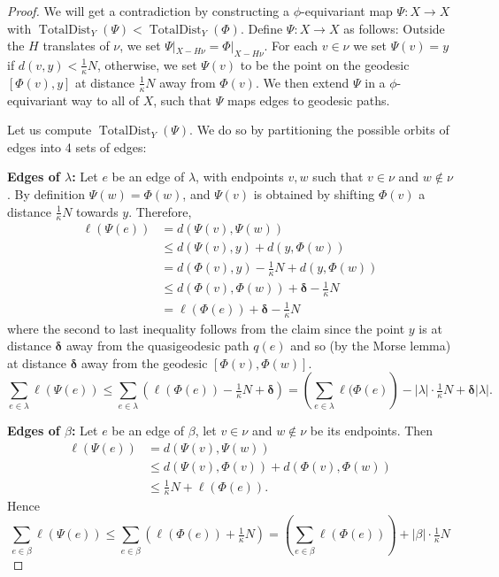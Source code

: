 \documentclass{amsart}
\numberwithin{equation}{section}
\theoremstyle{definition}
\newcommand{\bdelta}{{\boldsymbol\delta}}
\newcommand{\nir}[1]{\todo[inline, color=magenta]{#1}}
\DeclareMathOperator{\TD}{TotalDist}
\begin{document}
\begin{proof}
We will get a contradiction by constructing a $\phi$-equivariant map $\Psi:X\to X$ with $\TD_Y(\Psi)<\TD_Y(\Phi)$.
Define $\Psi:X\to X$ as follows:
Outside the $H$ translates of $\nu$, we set $\Psi|_{X-H\nu}=\Phi|_{X-H\nu}$. 
For each $v\in \nu$ we set $\Psi(v) =y$ if $d(v,y)<\tfrac 1\kappa N$, otherwise, we set $\Psi(v)$ to be the point on the geodesic $[\Phi(v),y]$ at distance $\tfrac 1\kappa N$ away from $\Phi(v)$.
We then extend $\Psi$ in a $\phi$-equivariant way to all of $X$, such that $\Psi$ maps edges to geodesic paths.

Let us compute $\TD_Y(\Psi)$. We do so by partitioning the possible orbits of edges into 4 sets of edges:

\noindent\textbf{Edges of $\lambda$:} 
Let $e$ be an edge of $\lambda$, with endpoints $v,w$ such that $v\in \nu$ and $w\notin \nu$. By definition $\Psi(w) = \Phi(w)$, and $\Psi(v)$ is obtained by shifting $\Phi(v)$ a distance $\tfrac 1\kappa N$ towards $y$. Therefore, 
\begin{align*}\ell(\Psi(e)) &= d(\Psi(v),\Psi(w))\\
&\le  d(\Psi(v),y)+d(y,\Phi(w))\\
& = d(\Phi(v),y) -\tfrac 1 \kappa N + d(y,\Phi(w))\\
&\le d(\Phi(v),\Phi(w))+\bdelta - \tfrac 1\kappa N\\
& =\ell(\Phi(e)) + \bdelta - \tfrac 1\kappa N
\end{align*}
where the second to last inequality follows from the claim since the point $y$ is at distance $\bdelta$ away from the quasigeodesic path $q(e)$ and so (by the Morse lemma) at distance $\bdelta$ away from the geodesic $[\Phi(v),\Phi(w)]$. 
\begin{equation}
\sum_{e\in\lambda} \ell(\Psi(e)) \le \sum_{e\in\lambda} \left(\ell(\Phi(e))-\tfrac 1\kappa N + \bdelta\right) = \left(\sum_{e\in\lambda} \ell(\Phi(e)\right) - |\lambda|\cdot \tfrac 1 \kappa N + \bdelta |\lambda|.
\end{equation}

\noindent\textbf{Edges of $\beta$:} Let $e$ be an edge of $\beta$, let $v\in \nu$ and $w\notin \nu$ be its endpoints. Then
\begin{align*}
\ell(\Psi(e)) &= d(\Psi(v),\Psi(w))\\
&\le  d(\Psi(v),\Phi(v))+d(\Phi(v),\Phi(w))\\
& \le \tfrac 1 \kappa N + \ell(\Phi(e)).
\end{align*}
Hence
\begin{equation}
\sum_{e\in\beta} \ell(\Psi(e)) \le \sum_{e\in\beta} \left(\ell(\Phi(e))+\tfrac 1\kappa N\right) = \left(\sum_{e\in\beta} \ell(\Phi(e))\right)+|\beta|\cdot \tfrac 1\kappa N
\end{equation}


\end{proof}
\end{document}
